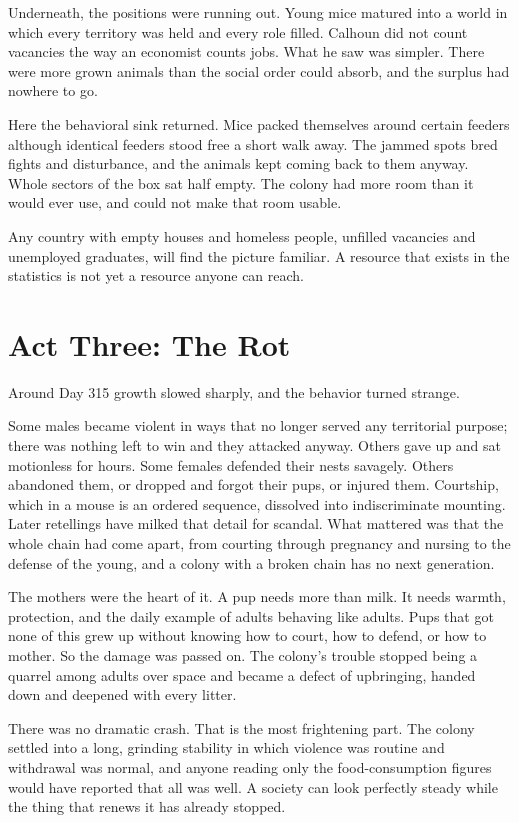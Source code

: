 \documentclass[12pt,a4paper]{book}
\begin{document}
Underneath, the positions were running out. Young mice matured into a world in which every territory was held and every role filled. Calhoun did not count vacancies the way an economist counts jobs. What he saw was simpler. There were more grown animals than the social order could absorb, and the surplus had nowhere to go.

Here the behavioral sink returned. Mice packed themselves around certain feeders although identical feeders stood free a short walk away. The jammed spots bred fights and disturbance, and the animals kept coming back to them anyway. Whole sectors of the box sat half empty. The colony had more room than it would ever use, and could not make that room usable.

Any country with empty houses and homeless people, unfilled vacancies and unemployed graduates, will find the picture familiar. A resource that exists in the statistics is not yet a resource anyone can reach.

\section{Act Three: The Rot}

Around Day 315 growth slowed sharply, and the behavior turned strange.

Some males became violent in ways that no longer served any territorial purpose; there was nothing left to win and they attacked anyway. Others gave up and sat motionless for hours. Some females defended their nests savagely. Others abandoned them, or dropped and forgot their pups, or injured them. Courtship, which in a mouse is an ordered sequence, dissolved into indiscriminate mounting. Later retellings have milked that detail for scandal. What mattered was that the whole chain had come apart, from courting through pregnancy and nursing to the defense of the young, and a colony with a broken chain has no next generation.

The mothers were the heart of it. A pup needs more than milk. It needs warmth, protection, and the daily example of adults behaving like adults. Pups that got none of this grew up without knowing how to court, how to defend, or how to mother. So the damage was passed on. The colony's trouble stopped being a quarrel among adults over space and became a defect of upbringing, handed down and deepened with every litter.

There was no dramatic crash. That is the most frightening part. The colony settled into a long, grinding stability in which violence was routine and withdrawal was normal, and anyone reading only the food-consumption figures would have reported that all was well. A society can look perfectly steady while the thing that renews it has already stopped.
\end{document}
